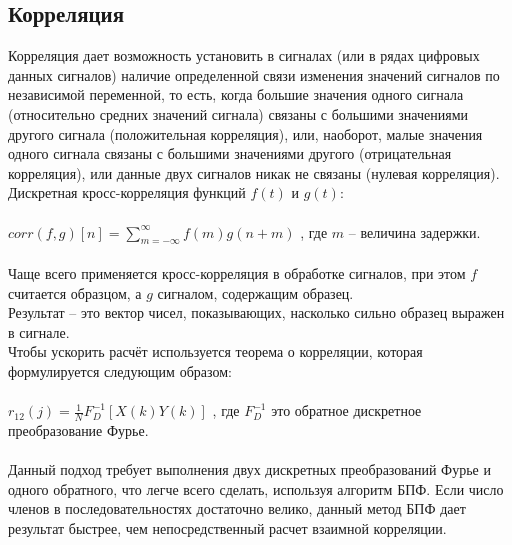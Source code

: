 \documentclass[a4paper,12pt]{article}
\begin{document}
\subsection{Корреляция}
Корреляция дает возможность установить в сигналах (или в рядах цифровых данных сигналов) наличие определенной связи изменения значений сигналов по независимой переменной, то есть, когда большие значения одного сигнала (относительно средних значений сигнала) связаны с большими значениями другого сигнала (положительная корреляция), или, наоборот, малые значения одного сигнала связаны с большими значениями другого (отрицательная корреляция), или данные двух сигналов никак не связаны (нулевая корреляция).
Дискретная кросс-корреляция функций $f(t)$ и $g(t)$:\\\\
$corr(f,g)[n] = {\sum_{m=-{\infty}}^{\infty}}f(m)g(n+m)$
, где $m$ -- величина задержки. \\\\
Чаще всего применяется кросс-корреляция в обработке сигналов, при этом $f$ считается образцом, а $g$ сигналом, содержащим образец.\\
 Результат -- это вектор чисел, показывающих, насколько сильно образец выражен в сигнале.\\
Чтобы ускорить расчёт используется теорема о корреляции, которая формулируется следующим образом:\\\\
$r_{12}(j)={\frac{1}{N}}F_D^{-1}[X(k)Y(k)]$
, где $F_D^{-1}$ это обратное дискретное преобразование Фурье.\\\\
Данный подход требует выполнения двух дискретных преобразований Фурье и одного обратного, что легче всего сделать, используя алгоритм БПФ. Если число членов в последовательностях достаточно велико, данный метод БПФ дает результат быстрее, чем непосредственный расчет взаимной корреляции. 
\newpage
\end{document}
